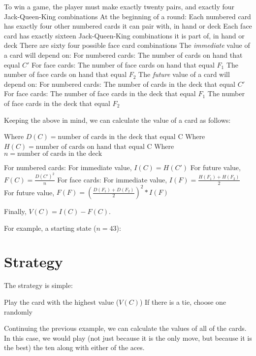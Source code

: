 \documentclass{article}
\begin{document}
\begin{outline}
  \1 To win a game, the player must make exactly twenty pairs, and exactly four Jack-Queen-King combinations
  \1 At the beginning of a round:
    \2 Each numbered card has exactly four other numbered cards it can pair with, in hand or deck
    \2 Each face card has exactly sixteen Jack-Queen-King combinations it is part of, in hand or deck
    \2 There are sixty four possible face card combinations
  \1 The \emph{immediate} value of a card will depend on:
    \2 For numbered cards:
      \3 The number of cards on hand that equal $C'$
    \2 For face cards:
      \3 The number of face cards on hand that equal $F_1$
      \3 The number of face cards on hand that equal $F_2$
  \1 The \emph{future} value of a card will depend on:
    \2 For numbered cards:
      \3 The number of cards in the deck that equal $C'$
    \2 For face cards:
      \3 The number of face cards in the deck that equal $F_1$
      \3 The number of face cards in the deck that equal $F_2$
\end{outline}

Keeping the above in mind, we can calculate the value of a card as follows:

\begin{outline}
  \1 Where $D(C) = \text{number of cards in the deck that equal C}$
  \1 Where $H(C) = \text{number of cards on hand that equal C}$
  \1 Where $n = \text{number of cards in the deck}$
\end{outline}

\begin{outline}
  \1 For numbered cards:
    \2 For immediate value, $I(C) = H(C')$
    \2 For future value, $F(C) = \frac{D(C')^2}{n}$
  \1 For face cards:
    \2 For immediate value, $I(F) = \frac{H(F_1) + H(F_2)}{2}$
    \2 For future value, $F(F) = (\frac{D(F_1) + D(F_2)}{2})^2 * I(F)$
\end{outline}

Finally, $V(C) = I(C) - F(C)$.

For example, a starting state ($n = 43$):

\vspace{3mm}


\section{Strategy}

The strategy is simple:

\begin{outline}
  \1 Play the card with the highest value ($V(C)$)
    \2 If there is a tie, choose one randomly
\end{outline}

Continuing the previous example, we can calculate the values of all of the cards. In this case, we would play (not just because it is the only move, but because it is the best) the ten along with either of the aces.
\end{document}
